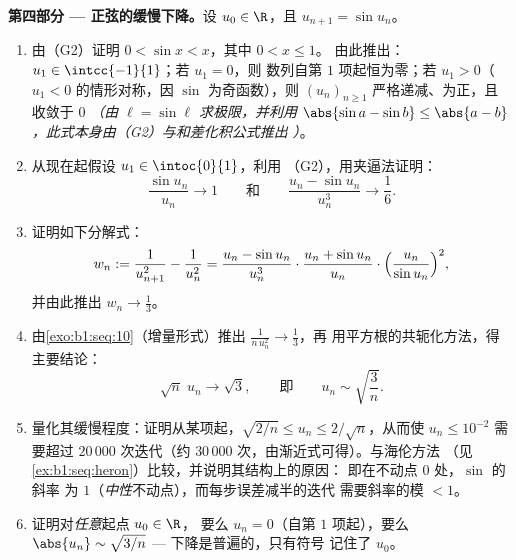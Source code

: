 \begin{problem}[{周末问题 --- 切萨罗--施托尔茨定理，
以及 $u_n \sim \sqrt{3/n}$ 的渐近性，对于 $u_{n+1} = \sin
u_n$}]
\medskip
\noindent\textbf{第四部分 --- 正弦的缓慢下降。}设
        $u_0 \in \R$，且 $u_{n+1} = \sin u_n$。
\begin{enumerate}[resume]
  \item 由（G2）证明 $0 < \sin x < x$，其中 $0 < x \leq 1$。
        由此推出：$u_1 \in \intcc{-1}{1}$；若 $u_1 = 0$，则
        数列自第 $1$ 项起恒为零；若 $u_1 > 0$（
        $u_1 < 0$ 的情形对称，因 $\sin$ 为奇函数），则
        $(u_n)_{n \geq 1}$ 严格递减、为正，且
        收敛于 $0$ \emph{（由 $\ell =
        \sin \ell$ 求极限，并利用 $\abs{\sin a - \sin b} \leq \abs{a -
        b}$，此式本身由（G2）与和差化积公式推出
        ）}。
  \item 从现在起假设 $u_1 \in \intoc{0}{1}$，利用
        （G2），用夹逼法证明：
        \[
        \frac{\sin u_n}{u_n} \to 1
        \qquad\text{和}\qquad
        \frac{u_n - \sin u_n}{u_n^{3}} \to \frac16 .
        \]
  \item 证明如下分解式：
        \[
        w_n := \frac{1}{u_{n+1}^{2}} - \frac{1}{u_n^{2}}
        = \frac{u_n - \sin u_n}{u_n^{3}} \cdot
        \frac{u_n + \sin u_n}{u_n} \cdot
        \Bigl(\frac{u_n}{\sin u_n}\Bigr)^{2},
        \]
        并由此推出 $w_n \to \frac13$。
  \item 由\cref{exo:b1:seq:10}（增量形式）推出
        $\frac{1}{n\,u_n^{2}} \to \frac13$，再
        用平方根的共轭化方法，得主要结论：
        \[
        \sqrt n\;u_n \longrightarrow \sqrt 3 ,
        \qquad\text{即}\qquad
        u_n \sim \sqrt{\frac 3n} .
        \]
  \item 量化其缓慢程度：证明从某项起，$\sqrt{2/n}
        \leq u_n \leq 2/\sqrt n$，从而使 $u_n \leq
        10^{-2}$ 需要超过 $20\,000$ 次迭代（约
        $30\,000$ 次，由渐近式可得）。与海伦方法
        （见\cref{ex:b1:seq:heron}）比较，并说明其结构上的原因：
        即在不动点 $0$ 处，$\sin$ 的斜率
        为 $1$（\emph{中性}不动点），而每步误差减半的迭代
        需要斜率的模 $< 1$。
  \item 证明对\emph{任意}起点 $u_0 \in \R$，
        要么 $u_n = 0$（自第 $1$ 项起），要么 $\abs{u_n} \sim
        \sqrt{3/n}$ --- 下降是普遍的，只有符号
        记住了 $u_0$。
\end{enumerate}


\end{problem}
